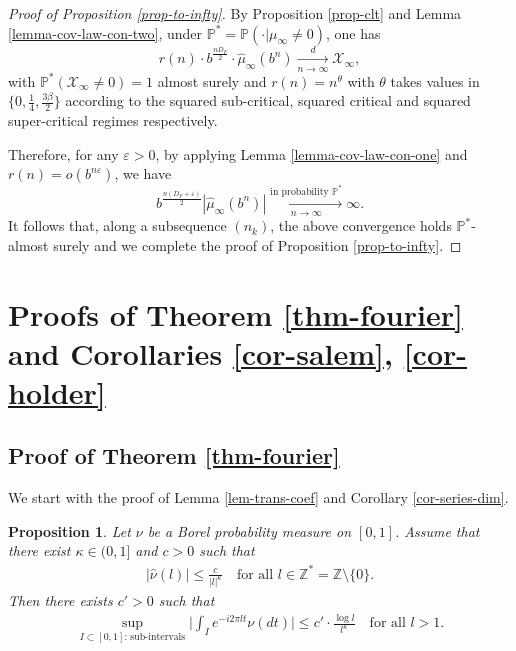 \documentclass[12pt]{amsart}
\newtheorem{proposition}[theorem]{Proposition}
\theoremstyle{definition}
\theoremstyle{remark}
\newcommand{\Z}{\mathbb{Z}}
\newcommand{\PP}{\mathbb{P}}
\numberwithin{equation}{section}
\begin{document}
\begin{proof}[Proof of Proposition \ref{prop-to-infty}]  
By Proposition \ref{prop-clt} and  Lemma \ref{lemma-cov-law-con-two},  under $\PP^* = \PP(\cdot |\mu_\infty\ne 0)$,   one has 
\[
r(n) \cdot  b^{\frac{n D_F}{2}}  \cdot \widehat{\mu}_\infty(b^{n})  \xrightarrow[n\to\infty]{d}   \mathcal{X}_\infty, 
\]
with  $\PP^* ( \mathcal{X}_\infty \ne 0)   = 1$  almost surely  and 
$
r(n) = n^\theta
$ with $\theta$ takes values in  $\{0, \frac{1}{4}, \frac{3\beta}{2}\}$  according to the squared sub-critical, squared critical and squared super-critical regimes respectively.   

Therefore,  for any $\varepsilon>0$,   by applying Lemma \ref{lemma-cov-law-con-one} and  $r(n) = o(b^{n\varepsilon})$, we have 
\[
b^{\frac{n (D_F+\varepsilon)}{2}} |\widehat{\mu}_\infty(b^{n})|   \xrightarrow[n\to\infty]{\text{in probability $\PP^*$}} \infty. 
\]
It follows that, along a subsequence $(n_k)$, the above convergence holds $\PP^*$-almost surely and  we complete the proof of Proposition \ref{prop-to-infty}. 
\end{proof}



\section{Proofs of Theorem \ref{thm-fourier} and Corollaries  \ref{cor-salem}, \ref{cor-holder}}\label{sec-con-1}



\subsection{Proof of Theorem \ref{thm-fourier}}

We start with the proof of Lemma \ref{lem-trans-coef} and Corollary \ref{cor-series-dim}. 


\begin{proposition}\label{lem-Fdecay}
Let $\nu$ be a  Borel probability measure on $[0,1]$.  Assume that there exist $\kappa\in (0,1]$ and $c>0$ such that 
\begin{align}\label{ass-poly-decay}
|\widehat{\nu}(l)|\le  \frac{c}{|l|^{\kappa}} \quad \text{for all $l\in \Z^* = \Z\setminus \{0\}$}.
\end{align}
Then there exists $c'>0$ such that
\begin{align}\label{rest-fourier}
\sup_{\text{$I \subset[0,1]$: sub-intervals}}\Big|\int_{I}e^{-i 2\pi l t}\nu(dt)\Big| \le c' \cdot \frac{\log l}{l^{\kappa}} \quad \text{for all $l>1$}. 
\end{align}
\end{proposition}
\end{document}
